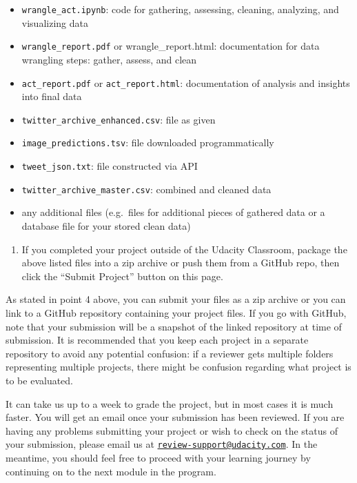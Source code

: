 \documentclass[]{book}
\providecommand{\tightlist}{%
  \setlength{\itemsep}{0pt}\setlength{\parskip}{0pt}}
\begin{document}
\begin{itemize}
\tightlist
\item
  \texttt{wrangle\_act.ipynb}: code for gathering, assessing, cleaning,
  analyzing, and visualizing data
\item
  \texttt{wrangle\_report.pdf} or wrangle\_report.html: documentation
  for data wrangling steps: gather, assess, and clean
\item
  \texttt{act\_report.pdf} or \texttt{act\_report.html}: documentation
  of analysis and insights into final data
\item
  \texttt{twitter\_archive\_enhanced.csv}: file as given
\item
  \texttt{image\_predictions.tsv}: file downloaded programmatically
\item
  \texttt{tweet\_json.txt}: file constructed via API
\item
  \texttt{twitter\_archive\_master.csv}: combined and cleaned data
\item
  any additional files (e.g.~files for additional pieces of gathered
  data or a database file for your stored clean data)
\end{itemize}

\begin{enumerate}
\def\labelenumi{\arabic{enumi}.}
\setcounter{enumi}{3}
\tightlist
\item
  If you completed your project outside of the Udacity Classroom,
  package the above listed files into a zip archive or push them from a
  GitHub repo, then click the ``Submit Project'' button on this page.
\end{enumerate}

As stated in point 4 above, you can submit your files as a zip archive
or you can link to a GitHub repository containing your project files. If
you go with GitHub, note that your submission will be a snapshot of the
linked repository at time of submission. It is recommended that you keep
each project in a separate repository to avoid any potential confusion:
if a reviewer gets multiple folders representing multiple projects,
there might be confusion regarding what project is to be evaluated.

It can take us up to a week to grade the project, but in most cases it
is much faster. You will get an email once your submission has been
reviewed. If you are having any problems submitting your project or wish
to check on the status of your submission, please email us at
\href{mailto:review-support@udacity.com}{\nolinkurl{review-support@udacity.com}}.
In the meantime, you should feel free to proceed with your learning
journey by continuing on to the next module in the program.
\end{document}
